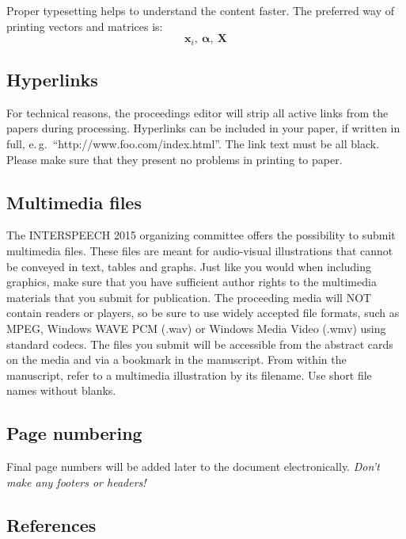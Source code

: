\documentclass[a4paper]{article}
\def\vec#1{\ensuremath{\bm{{#1}}}}
\def\mat#1{\vec{#1}}
\begin{document}
      Proper typesetting helps to understand the content faster.
      The preferred way of printing vectors and matrices is:
      \begin{equation}
        \vec{x}_i,~\vec{\alpha},~\mat{X}
      \end{equation}

  
    \subsection{Hyperlinks}

      For technical reasons, the proceedings editor will strip all active links from the papers during processing. 
      Hyperlinks can be included in your paper, if written in full, e.\,g.\ ``http://www.foo.com/index.html''.
      The link text must be all black. 
      Please make sure that they present no problems in printing to paper.

  
    \subsection{Multimedia files}

      The INTERSPEECH 2015 organizing committee offers the possibility to submit multimedia files. 
      These files are meant for audio-visual illustrations that cannot be conveyed in text, tables and graphs.
      Just like you would when including graphics, make sure that you have sufficient author rights to the multimedia materials that you submit for publication. 
      The proceeding media will NOT contain readers or players, so be sure to use widely accepted file formats, such as MPEG, Windows WAVE PCM (.wav) or Windows Media Video (.wmv) using standard codecs.
      The files you submit will be accessible from the abstract cards on the media and via a bookmark in the manuscript.
      From within the manuscript, refer to a multimedia illustration by its filename. Use short file names without blanks.

  
    \subsection{Page numbering}

      Final page numbers will be added later to the document electronically.
      \emph{Don't make any footers or headers!}

  
    \subsection{References}
\end{document}

